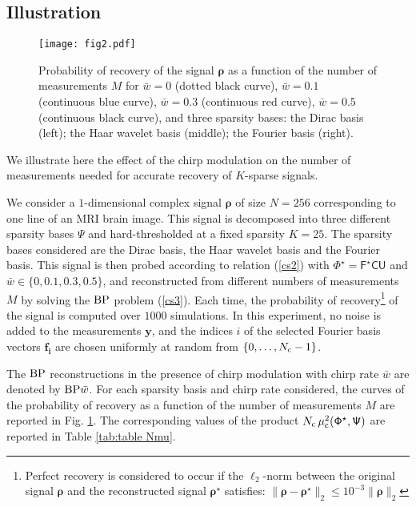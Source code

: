 \documentclass[10pt,draftcls, onecolumn]{IEEEtran}
\begin{document}
\subsection{Illustration}
\label{sub:illustration}

\begin{figure}
\centering
\texttt{[image: fig2.pdf]}
\caption{\label{fig:theory ssp} Probability of recovery of the signal $\bm{\rho}$ as a function of the number of measurements $M$ for $\bar{w}=0$ (dotted black curve), $\bar{w}=0.1$ (continuous blue curve), $\bar{w}=0.3$ (continuous red curve), $\bar{w}=0.5$ (continuous black curve), and three sparsity bases: the Dirac basis (left); the Haar wavelet basis (middle); the Fourier basis (right).}
\end{figure}


We illustrate here the effect of the chirp modulation on the number of measurements needed for accurate recovery of $K$-sparse signals.

We consider a $1$-dimensional complex signal $\bm{\rho}$ of size $N = 256$ corresponding to one line of an MRI brain image. This signal is decomposed into three different sparsity bases $\mathsf{\Psi}$ and hard-thresholded at a fixed sparsity $K = 25$. The sparsity bases considered are the Dirac basis, the Haar wavelet basis and the Fourier basis. This signal is then probed according to relation (\ref{cs2}) with $\mathsf{\Phi^{\star}}=\mathsf{F^{\star}CU}$ and $\bar{w} \in \{0, 0.1, 0.3, 0.5\}$, and reconstructed from different numbers of measurements $M$ by solving the $\rm{BP}$ problem (\ref{cs3}). Each time, the probability of recovery\footnote{Perfect recovery is considered to occur if the $\ell_2$-norm between the original signal $\bm{\rho}$ and the reconstructed signal $\bm{\rho}^\star$ satisfies: $\|\bm{\rho}-\bm{\rho}^\star\|_2\leq10^{-3}\|\bm{\rho}\|_2$} of the signal is computed over $1000$ simulations. In this experiment, no noise is added to the measurements $\bm{y}$, and the indices $i$ of the selected Fourier basis vectors $\bm{f_i}$ are chosen uniformly at random from $\{0, \ldots, N_{\rm c}-1\}$.

The ${\rm BP}$ reconstructions in the presence of chirp modulation with chirp rate $\bar{w}$ are denoted by ${\rm BP}\bar{w}$. For each sparsity basis and chirp rate considered, the curves of the probability of recovery as a function of the number of measurements $M$ are reported in Fig. \ref{fig:theory ssp}. The corresponding values of the product $N_{\rm c} \, \mu_{\rm c}^2(\mathsf{\Phi}^{\star}, \mathsf{\Psi})$ are reported in Table \ref{tab:table Nmu}. 
\end{document}

